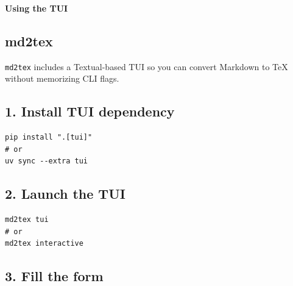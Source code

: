 \documentclass[a4paper, 12pt, twoside]{article}
\begin{document}
\begin{titlepage}
    \vspace*{5cm}
    \begin{center}
        \Huge \textbf{Using the TUI}
    \end{center}
    \vfill
\end{titlepage}

\tableofcontents
\clearpage

\subsection*{md2tex}

\texttt{md2tex} includes a Textual-based TUI so you can convert Markdown to TeX without memorizing CLI flags.

\subsection*{1. Install TUI dependency}

\begin{listing}[h!]
    \begin{verbatim}
pip install ".[tui]"
# or
uv sync --extra tui
    \end{verbatim}
\end{listing}

\subsection*{2. Launch the TUI}

\begin{listing}[h!]
    \begin{verbatim}
md2tex tui
# or
md2tex interactive
    \end{verbatim}
\end{listing}

\subsection*{3. Fill the form}
\end{document}
